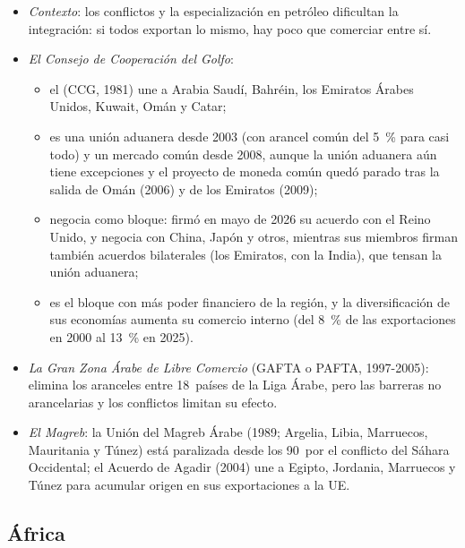 \documentclass[11pt]{article}
\begin{document}
\begin{itemize}
\item \emph{Contexto}: los conflictos y la especialización en petróleo dificultan la integración: si todos exportan lo mismo, hay poco que comerciar entre sí.
\item \emph{El Consejo de Cooperación del Golfo}:
  \begin{itemize}
  \item el  (CCG, 1981) une a Arabia Saudí, Bahréin, los Emiratos Árabes Unidos, Kuwait, Omán y Catar;
  \item es una unión aduanera desde 2003 (con arancel común del 5~\% para casi todo) y un mercado común desde 2008, aunque la unión aduanera aún tiene excepciones y el proyecto de moneda común quedó parado tras la salida de Omán (2006) y de los Emiratos (2009)\nocite{JETRO2026CCG};
  \item negocia como bloque: firmó en mayo de 2026 su acuerdo con el Reino Unido\nocite{PwC2026ReinoUnidoCCG}, y negocia con China, Japón y otros, mientras sus miembros firman también acuerdos bilaterales (los Emiratos, con la India), que tensan la unión aduanera;
  \item es el bloque con más poder financiero de la región, y la diversificación de sus economías aumenta su comercio interno (del 8~\% de las exportaciones en 2000 al 13~\% en 2025).
  \end{itemize}
\item \emph{La Gran Zona Árabe de Libre Comercio} (GAFTA o PAFTA, 1997-2005): elimina los aranceles entre 18~países de la Liga Árabe, pero las barreras no arancelarias y los conflictos limitan su efecto.
\item \emph{El Magreb}: la Unión del Magreb Árabe (1989; Argelia, Libia, Marruecos, Mauritania y Túnez) está paralizada desde los 90~por el conflicto del Sáhara Occidental; el Acuerdo de Agadir (2004) une a Egipto, Jordania, Marruecos y Túnez para acumular origen en sus exportaciones a la UE.
\end{itemize}

\subsection{África}\label{sec:africa}
\end{document}
